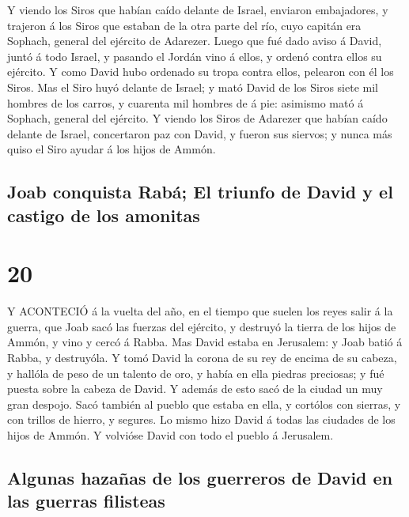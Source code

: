  Y viendo los Siros que habían caído delante de Israel,
enviaron embajadores, y trajeron á los Siros que estaban de la otra
parte del río, cuyo capitán era Sophach, general del ejército de
Adarezer.  Luego que fué dado aviso á David, juntó á todo
Israel, y pasando el Jordán vino á ellos, y ordenó contra ellos su
ejército. Y como David hubo ordenado su tropa contra ellos, pelearon con
él los Siros.  Mas el Siro huyó delante de Israel; y mató
David de los Siros siete mil hombres de los carros, y cuarenta mil
hombres de á pie: asimismo mató á Sophach, general del ejército.
 Y viendo los Siros de Adarezer que habían caído delante de
Israel, concertaron paz con David, y fueron sus siervos; y nunca más
quiso el Siro ayudar á los hijos de Ammón.

\hypertarget{joab-conquista-rabuxe1-el-triunfo-de-david-y-el-castigo-de-los-amonitas}{%
\subsection{Joab conquista Rabá; El triunfo de David y el castigo de los
amonitas}\label{joab-conquista-rabuxe1-el-triunfo-de-david-y-el-castigo-de-los-amonitas}}

\hypertarget{section-19}{%
\section{20}\label{section-19}}

 Y ACONTECIÓ á la vuelta del año, en el tiempo que suelen
los reyes salir á la guerra, que Joab sacó las fuerzas del ejército, y
destruyó la tierra de los hijos de Ammón, y vino y cercó á Rabba. Mas
David estaba en Jerusalem: y Joab batió á Rabba, y destruyóla.
 Y tomó David la corona de su rey de encima de su cabeza, y
hallóla de peso de un talento de oro, y había en ella piedras preciosas;
y fué puesta sobre la cabeza de David. Y además de esto sacó de la
ciudad un muy gran despojo.  Sacó también al pueblo que
estaba en ella, y cortólos con sierras, y con trillos de hierro, y
segures. Lo mismo hizo David á todas las ciudades de los hijos de Ammón.
Y volvióse David con todo el pueblo á Jerusalem.

\hypertarget{algunas-hazauxf1as-de-los-guerreros-de-david-en-las-guerras-filisteas}{%
\subsection{Algunas hazañas de los guerreros de David en las guerras
filisteas}\label{algunas-hazauxf1as-de-los-guerreros-de-david-en-las-guerras-filisteas}}

